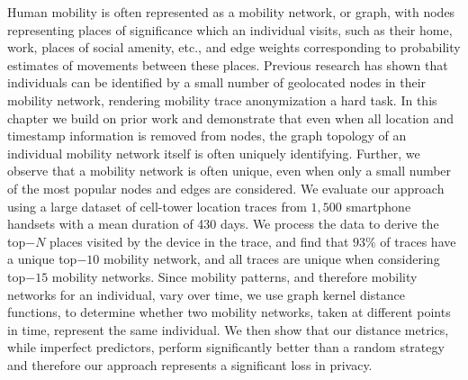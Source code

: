 
{Human mobility is often represented as a mobility network, or graph, with nodes representing places of significance which an individual visits, such as their home, work, places of social amenity, etc., and edge weights corresponding to probability estimates of movements between these places.
Previous research has shown that individuals can be identified by a small number of geolocated nodes in their mobility network, rendering mobility trace anonymization a hard task.
In this chapter we build on prior work and demonstrate that even when all location and timestamp information is removed from nodes, the graph topology of an individual mobility network itself is often uniquely identifying. 
Further, we observe that a mobility network is often unique, even when only a small number of the most popular nodes and edges are considered. 
We evaluate our approach using a large dataset of cell-tower location traces from $1,500$ smartphone handsets with a mean duration of 430 days.
We process the data to derive the top$-N$ places visited by the device in the trace, and find that $93\%$ of traces have a unique top$-10$ mobility network, and all traces are unique when considering top$-15$ mobility networks.
Since mobility patterns, and therefore mobility networks for an individual, vary over time, we use graph kernel distance functions, to determine whether two mobility networks, taken at different points in time, represent the same individual.
We then show that our distance metrics, while imperfect predictors, perform significantly better than a random strategy and therefore our approach represents a significant loss in privacy.}